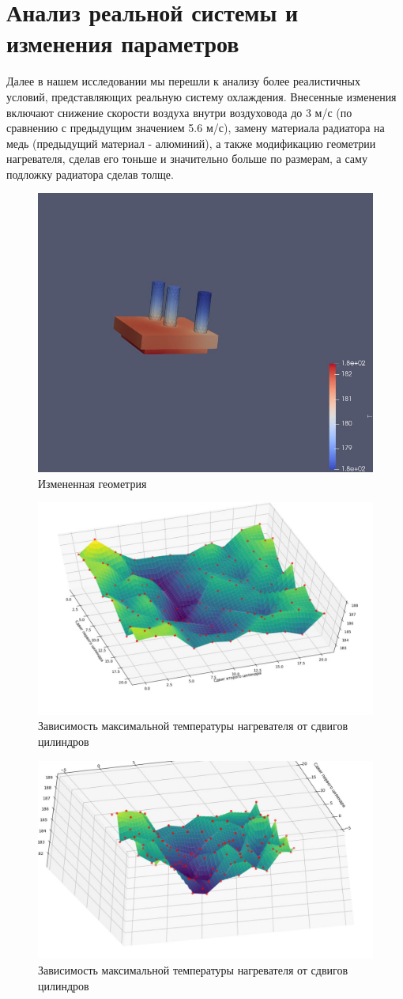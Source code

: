 \documentclass[a4paper,12pt]{article}
\theoremstyle{plain} %
\theoremstyle{definition} %
\theoremstyle{remark} %
\begin{document}
\section{Анализ реальной системы и изменения параметров}

Далее в нашем исследовании мы перешли к анализу более реалистичных условий, представляющих реальную систему охлаждения. Внесенные изменения включают снижение скорости воздуха внутри воздуховода до 3 м/с (по сравнению с предыдущим значением 5.6 м/с), замену материала радиатора на медь (предыдущий материал - алюминий), а также модификацию геометрии нагревателя, сделав его тоньше и значительно больше по размерам, а саму подложку радиатора сделав толще.

\begin{figure}[h]
	\begin{center}
		\includegraphics[width=0.4\linewidth]{23.1.jpg}
		\caption{Измененная геометрия} %
	\end{center}
\end{figure}
\begin{figure}[h]
	\begin{center}
		\includegraphics[width=0.4\linewidth]{23.2.jpg}
		\caption{Зависимость максимальной температуры нагревателя от сдвигов цилиндров} %
	\end{center}
\end{figure}
\begin{figure}[h]
	\begin{center}
		\includegraphics[width=0.4\linewidth]{23.3.jpg}
		\caption{Зависимость максимальной температуры нагревателя от сдвигов цилиндров} %
	\end{center}
\end{figure}
\end{document}
